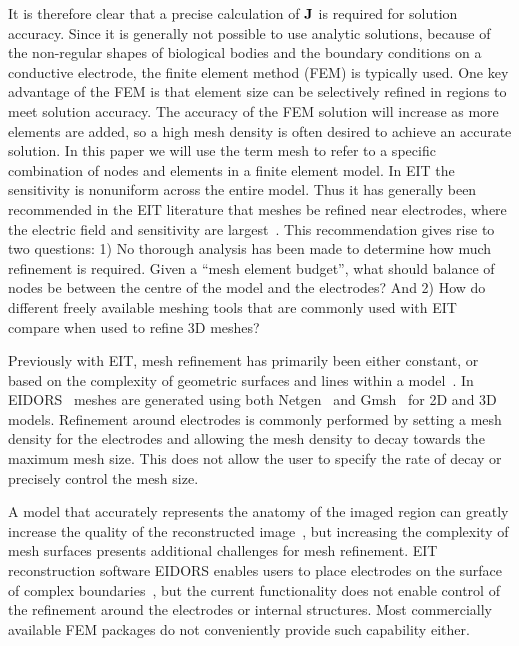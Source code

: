\documentclass[12pt]{iopart}
\begin{document}
It is therefore clear that a precise  calculation of $\bf J$ is
required for solution accuracy. Since it is generally not
possible to use analytic solutions, because of the non-regular
shapes of biological bodies and the boundary conditions on a
conductive electrode, the finite element method (FEM) is typically
used. 
One key advantage of the FEM is that element size can be
selectively refined in regions to meet solution accuracy. 
The accuracy of the FEM solution will increase as more elements are
added, so a high mesh density is often desired to achieve an 
accurate solution. 
In this paper we will use the term mesh to refer to a specific 
combination of nodes and elements in a finite element model. 
In EIT the sensitivity is nonuniform 
across the entire model.
Thus
it has generally been recommended in the EIT literature 
that meshes be refined near electrodes, where the electric 
field and sensitivity are largest~\parencite{adler_electrical_2017}. 
This recommendation gives rise to two questions: 
1) No thorough analysis has been made to determine how much 
refinement is required. Given a ``mesh element budget'', what should
balance of nodes be between the centre of the model and the electrodes? And 
2) How do different freely available meshing tools that are
commonly used with EIT compare when used to refine 3D meshes?

Previously with EIT, mesh refinement has primarily been either 
constant, or based on 
the complexity of geometric surfaces and lines within a model~\parencite{grychtol_fem_2013}.  
In EIDORS~\parencite{adler_uses_2006} meshes are generated using both 
Netgen~\parencite{schoberl_netgen_1997} and Gmsh~\parencite{geuzaine_gmsh_2009} 
for 2D and 3D models. 
Refinement around electrodes is commonly performed by 
setting a mesh density for the electrodes and allowing the mesh density to 
decay towards the maximum mesh size. This does not allow the user to specify 
the rate of decay or precisely control the mesh size.   

A model that accurately represents the anatomy of the imaged region 
can greatly increase the quality of the reconstructed image~\parencite{grychtol_impact_2012},
but increasing the complexity of mesh surfaces presents additional challenges for
mesh refinement.  EIT reconstruction software EIDORS enables users to place electrodes on the surface of complex 
boundaries~\parencite{grychtol_fem_2013}, but the current functionality does not  
enable control of the refinement around the electrodes or internal 
structures.
Most commercially available FEM packages
do not conveniently provide such capability either.
\end{document}
